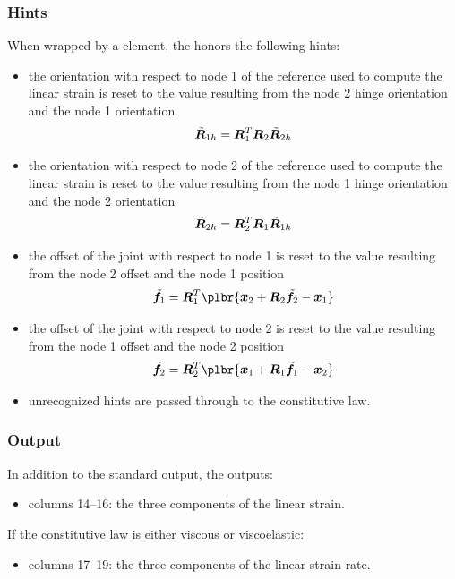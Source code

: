 \subsubsection{Hints}
When wrapped by a  element, the 
honors the following hints:
\begin{itemize}
\item {} the orientation with respect to node 1
of the reference used to compute the linear strain is reset
to the value resulting from the node 2 hinge orientation
and the node 1 orientation
\begin{displaymath}
	\tilde{\boldsymbol{R}}_{1h} = \boldsymbol{R}_1^T \boldsymbol{R}_2 \tilde{\boldsymbol{R}}_{2h}
\end{displaymath}
\item {} the orientation with respect to node 2
of the reference used to compute the linear strain is reset
to the value resulting from the node 1 hinge orientation
and the node 2 orientation
\begin{displaymath}
	\tilde{\boldsymbol{R}}_{2h} = \boldsymbol{R}_2^T \boldsymbol{R}_1 \tilde{\boldsymbol{R}}_{1h}
\end{displaymath}
\item {} the offset of the joint
with respect to node 1 is reset to the value resulting 
from the node 2 offset and the node 1 position
\begin{displaymath}
	\tilde{\T{f}}_1 = \T{R}_1^T \plbr{
		\T{x}_2
		+ \T{R}_2 \tilde{\T{f}}_2
		- \T{x}_1
	}
\end{displaymath}
\item {} the offset of the joint
with respect to node 2 is reset to the value resulting 
from the node 1 offset and the node 2 position
\begin{displaymath}
	\tilde{\T{f}}_2 = \T{R}_2^T \plbr{
		\T{x}_1
		+ \T{R}_1 \tilde{\T{f}}_1
		- \T{x}_2
	}
\end{displaymath}
\item unrecognized hints are passed through to the constitutive law.
\end{itemize}

\subsubsection{Output}
In addition to the standard output, the 
outputs:
\begin{itemize}
\item columns 14--16: the three components of the linear strain.
\end{itemize}
If the constitutive law is either viscous or viscoelastic:
\begin{itemize}
\item columns 17--19: the three components of the linear strain rate.
\end{itemize}



